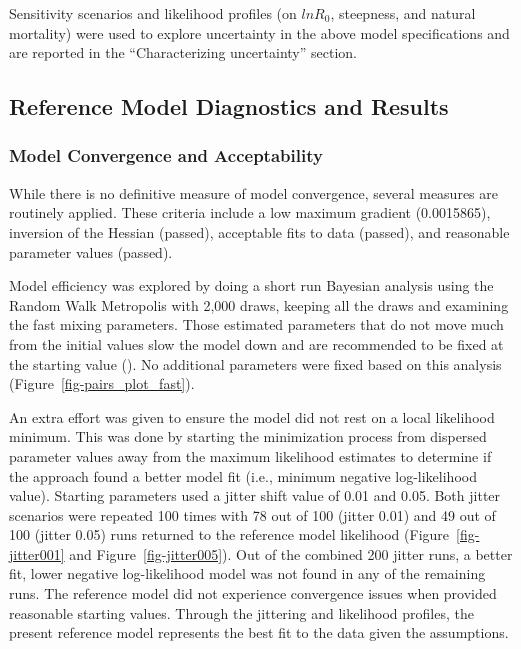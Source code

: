 \documentclass[
]{scrartcl}
\begin{document}
Sensitivity scenarios and likelihood profiles (on \(lnR_0\), steepness,
and natural mortality) were used to explore uncertainty in the above
model specifications and are reported in the ``Characterizing
uncertainty'' section.

\newpage{}

\subsection{Reference Model Diagnostics and
Results}\label{reference-model-diagnostics-and-results}

\subsubsection{Model Convergence and
Acceptability}\label{model-convergence}

While there is no definitive measure of model convergence, several
measures are routinely applied. These criteria include a low maximum
gradient (0.0015865), inversion of the Hessian (passed), acceptable fits
to data (passed), and reasonable parameter values (passed).

Model efficiency was explored by doing a short run Bayesian analysis
using the Random Walk Metropolis with 2,000 draws, keeping all the draws
and examining the fast mixing parameters. Those estimated parameters
that do not move much from the initial values slow the model down and
are recommended to be fixed at the starting value
(). No
additional parameters were fixed based on this analysis
(Figure~\ref{fig-pairs_plot_fast}).

An extra effort was given to ensure the model did not rest on a local
likelihood minimum. This was done by starting the minimization process
from dispersed parameter values away from the maximum likelihood
estimates to determine if the approach found a better model fit (i.e.,
minimum negative log-likelihood value). Starting parameters used a
jitter shift value of 0.01 and 0.05. Both jitter scenarios were repeated
100 times with 78 out of 100 (jitter 0.01) and 49 out of 100 (jitter
0.05) runs returned to the reference model likelihood
(Figure~\ref{fig-jitter001} and Figure~\ref{fig-jitter005}). Out of the
combined 200 jitter runs, a better fit, lower negative log-likelihood
model was not found in any of the remaining runs. The reference model
did not experience convergence issues when provided reasonable starting
values. Through the jittering and likelihood profiles, the present
reference model represents the best fit to the data given the
assumptions.
\end{document}
